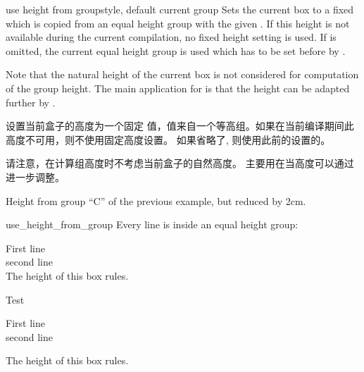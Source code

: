 \begin{docTcbKey}[][doc new and updated={2015-11-27}{2016-02-22}]{use height from group}{}{style, default current group}
Sets the current box to a fixed  which is copied from
an equal height group with the given . If this height is not
available during the current compilation, no fixed height setting is used.
If  is omitted, the current equal height group is used which has
to be set before by .\par
Note that the natural height of the current box is not considered for
computation of the group height. The main application for
 is that the height can be adapted
further by .

设置当前盒子的高度为一个固定  值，值来自一个等高组。如果在当前编译期间此高度不可用，则不使用固定高度设置。
如果省略了, 则使用此前的设置的。\par
请注意，在计算组高度时不考虑当前盒子的自然高度。
主要用在当高度可以通过  进一步调整。

\begin{dispExample}
\begin{tcolorbox}[use height from group=C,add to height=-2cm,
colframe=blue!75!black,colback=white]
Height from group \enquote{C} of the previous example, but reduced by 2cm.
\end{tcolorbox}%
\end{dispExample}

\begin{exdispExample}[runs=2]{use_height_from_group}
Every line is inside an equal height group:
\begin{tcbraster}[raster equal height=rows,
title=Box \thetcbrasternum,
enhanced,size=small,colframe=red!50!black,colback=red!10!white]
\begin{tcolorbox}First line\\second line\\
The height of this box rules.\end{tcolorbox}
\begin{tcolorbox}Test\end{tcolorbox}
\begin{tcolorbox}
First line\\second line\end{tcolorbox}
\begin{tcolorbox}The height of this box rules.\end{tcolorbox}
\end{tcbraster}
\end{exdispExample}
\end{docTcbKey}



